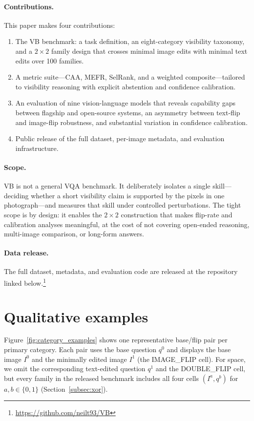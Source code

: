 \documentclass[11pt]{article}
\newcommand{\benchmarkname}{\textsc{VB}}
\begin{document}
\paragraph{Contributions.}
This paper makes four contributions:
\begin{enumerate}[noitemsep, topsep=3pt]
  \item The \benchmarkname{} benchmark: a task definition, an eight-category visibility taxonomy, and a \(2 \times 2\) family design that crosses minimal image edits with minimal text edits over 100 families.
  \item A metric suite---CAA, MEFR, SelRank, and a weighted composite---tailored to visibility reasoning with explicit abstention and confidence calibration.
  \item An evaluation of nine vision-language models that reveals capability gaps between flagship and open-source systems, an asymmetry between text-flip and image-flip robustness, and substantial variation in confidence calibration.
  \item Public release of the full dataset, per-image metadata, and evaluation infrastructure.
\end{enumerate}

\paragraph{Scope.}
\benchmarkname{} is not a general VQA benchmark. It deliberately isolates a single skill---deciding whether a short visibility claim is supported by the pixels in one photograph---and measures that skill under controlled perturbations. The tight scope is by design: it enables the \(2\times 2\) construction that makes flip-rate and calibration analyses meaningful, at the cost of not covering open-ended reasoning, multi-image comparison, or long-form answers.

\paragraph{Data release.}
The full dataset, metadata, and evaluation code are released at the repository linked below.\footnote{\url{https://github.com/neilt93/VB}}

\section{Qualitative examples}
\label{sec:examples}

Figure~\ref{fig:category_examples} shows one representative base/flip pair per primary category. Each pair uses the base question \(q^0\) and displays the base image \(I^0\) and the minimally edited image \(I^1\) (the IMAGE\_FLIP cell). For space, we omit the corresponding text-edited question \(q^1\) and the DOUBLE\_FLIP cell, but every family in the released benchmark includes all four cells \((I^a,q^b)\) for \(a,b \in \{0,1\}\) (Section~\ref{subsec:xor}).
\end{document}
